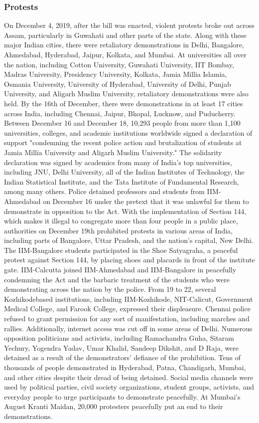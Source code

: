 \documentclass{article}
\begin{document}
\subsubsection{Protests}
On December 4, 2019, after the bill was enacted, violent protests broke out across Assam, particularly in Guwahati and other parts of the state. Along with these major Indian cities, there were retaliatory demonstrations in Delhi, Bangalore, Ahmedabad, Hyderabad, Jaipur, Kolkata, and Mumbai.
At universities all over the nation, including Cotton University, Guwahati University, IIT Bombay, Madras University, Presidency
University, Kolkata, Jamia Millia Islamia, Osmania University, University of Hyderabad, University of Delhi, Punjab University, and Aligarh Muslim University, retaliatory demonstrations were also held. By the 16th of December, there were demonstrations in at least
17 cities across India, including Chennai, Jaipur, Bhopal, Lucknow, and Puducherry.
Between December 16 and December 18, 10,293 people from more than 1,100 universities, colleges, and academic institutions worldwide signed a declaration of support "condemning the recent police action and brutalization of students at Jamia Millia University and Aligarh Muslim University." The solidarity declaration was signed by academics from many of India's top universities, including JNU, Delhi University, all of the Indian Institutes of Technology, the Indian Statistical Institute, and the Tata Institute of Fundamental Research, among many others. Police detained professors and students from IIM-Ahmedabad on December 16 under the pretext that it was unlawful for them to demonstrate in opposition to the Act.
With the implementation of Section 144, which makes it illegal to congregate more than four people in a public place, authorities on December 19th prohibited protests in various areas of India, including parts of Bangalore, Uttar Pradesh, and the nation's capital, New Delhi. The IIM-Bangalore students participated in the Shoe Satyagraha, a peaceful protest against Section 144, by placing shoes and placards in front of the institute gate. IIM-Calcutta joined IIM-Ahmedabad and IIM-Bangalore in peacefully condemning the Act and the barbaric treatment of the students who were demonstrating across the nation by the police. From 19 to 22, several Kozhikodebased institutions, including IIM-Kozhikode, NIT-Calicut, Government Medical College, and Farook College, expressed their displeasure.
Chennai police refused to grant permission for any sort of manifestation, including marches and rallies. Additionally, internet access was cut off in some areas of Delhi. Numerous opposition politicians and activists, including Ramachandra Guha, Sitaram Yechury, Yogendra Yadav, Umar Khalid, Sandeep Dikshit, and D Raja, were detained as a result of the demonstrators' defiance of the prohibition. Tens of thousands of people demonstrated in Hyderabad, Patna, Chandigarh, Mumbai, and other cities despite their dread of being detained. Social media channels were used by political parties, civil society organizations, student groups, activists, and everyday people to urge participants to demonstrate peacefully. At Mumbai's August Kranti Maidan, 20,000 protesters peacefully
put an end to their demonstrations.
\end{document}
